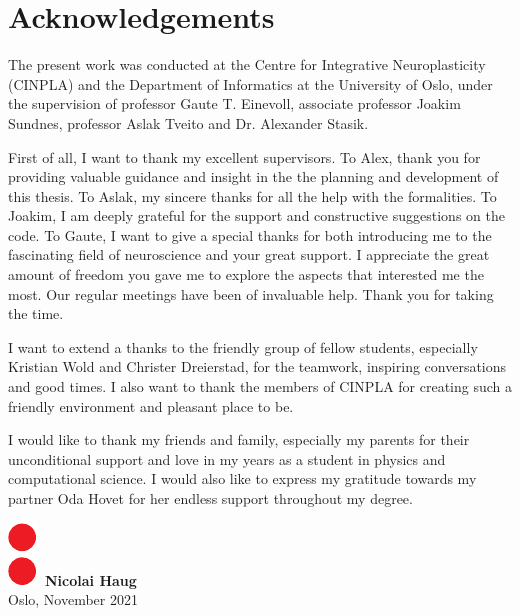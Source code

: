 \chapter*{Acknowledgements}
\thispagestyle{plain}

The present work was conducted at the Centre for Integrative Neuroplasticity (CINPLA) and the Department of Informatics at the University of Oslo, under the supervision of professor Gaute T. Einevoll, associate professor Joakim Sundnes, professor Aslak Tveito and Dr. Alexander Stasik. 

First of all, I want to thank my excellent supervisors. To Alex, thank you for providing valuable guidance and insight in the the planning and development of this thesis. To Aslak, my sincere thanks for all the help with the formalities. To Joakim, I am deeply grateful for the support and constructive suggestions on the code. To Gaute, I want to give a special thanks for both introducing me to the fascinating field of neuroscience and your great support. I appreciate the great amount of freedom you gave me to explore the aspects that interested me the most. Our regular meetings have been of invaluable help. Thank you for taking the time. 

I want to extend a thanks to the friendly group of fellow students, especially Kristian Wold and Christer Dreierstad, for the teamwork, inspiring conversations and good times. I also want to thank the members of CINPLA for creating such a friendly environment and pleasant place to be. 

I would like to thank my friends and family, especially my parents for their unconditional support and love in my years as a student in physics and computational science. I would also like to express my gratitude towards my partner Oda Hovet for her endless support throughout my degree. 
\\ [8 pt]


\begin{flushright}
\includegraphics[height = 1.5ex]{latex/latex-report/3_Images/Logo/UiO/uio-colon.pdf}\, \textbf{Nicolai Haug}
\\
Oslo, November 2021
\end{flushright}
